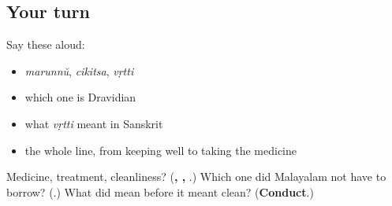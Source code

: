 \subsection*{Your turn}
Say these aloud:

\begin{itemize}
\raggedright
  \item \emph{marunnŭ}, \emph{cikitsa}, \emph{vṛtti}
  \item which one is Dravidian
  \item what \emph{vṛtti} meant in Sanskrit
  \item the whole line, from keeping well to taking the medicine
\end{itemize}

\begin{tcolorbox}[breakable,colback=teal!4,colframe=teal!35!black,title={Before you move on}]
Medicine, treatment, cleanliness? (\textbf{, , }.) Which one did Malayalam not have to borrow? (\textbf{}.) What did \textbf{} mean before it meant clean? (\textbf{Conduct}.)
\end{tcolorbox}

